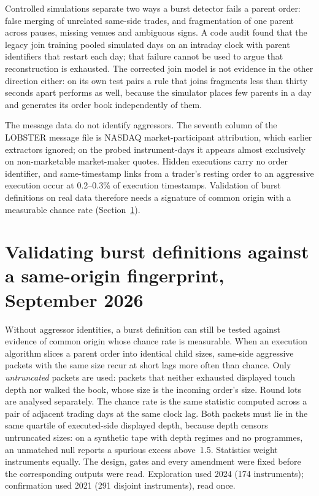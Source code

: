 \documentclass[11pt]{article}
\begin{document}
Controlled simulations separate two ways a burst detector fails a parent order: false merging of
unrelated same-side trades, and fragmentation of one parent across pauses, missing venues and
ambiguous signs. A code audit found that the legacy join training pooled simulated days on an
intraday clock with parent identifiers that restart each day; that failure cannot be used to
argue that reconstruction is exhausted. The corrected join model is not evidence in the other
direction either: on its own test pairs a rule that joins fragments less than thirty seconds
apart performs as well, because the simulator places few parents in a day and generates its
order book independently of them.

The message data do not identify aggressors. The seventh column of the LOBSTER message file is
NASDAQ market-participant attribution, which earlier extractors ignored; on the probed
instrument-days it appears almost exclusively on non-marketable market-maker quotes. Hidden
executions carry no order identifier, and same-timestamp links from a trader's resting order to
an aggressive execution occur at 0.2--0.3\% of execution timestamps. Validation of burst
definitions on real data therefore needs a signature of common origin with a measurable chance
rate (Section~\ref{sec:fingerprint2026}).

\section{Validating burst definitions against a same-origin fingerprint, September 2026}
\label{sec:fingerprint2026}

Without aggressor identities, a burst definition can still be tested against evidence of common
origin whose chance rate is measurable. When an execution algorithm slices a parent order into
identical child sizes, same-side aggressive packets with the same size recur at short lags more
often than chance. Only \emph{untruncated} packets are used: packets that neither exhausted
displayed touch depth nor walked the book, whose size is the incoming order's size. Round lots
are analysed separately. The chance rate is the same statistic computed across a pair of
adjacent trading days at the same clock lag. Both packets must lie in the same quartile of
executed-side displayed depth, because depth censors untruncated sizes: on a synthetic tape with
depth regimes and no programmes, an unmatched null reports a spurious excess above~1.5.
Statistics weight instruments equally. The design, gates and every amendment were fixed before
the corresponding outputs were read. Exploration used 2024 (174 instruments); confirmation used
2021 (291 disjoint instruments), read once.
\end{document}
